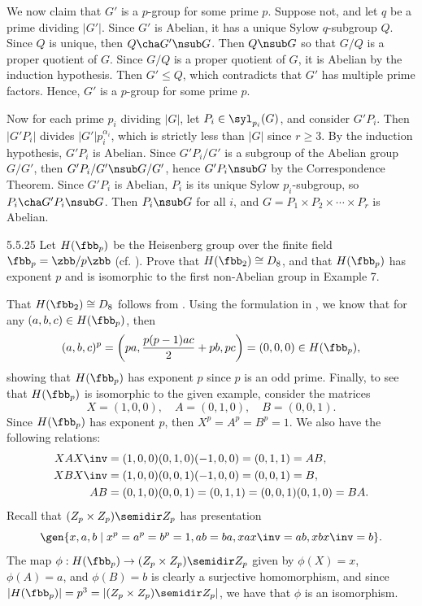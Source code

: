 \begin{soliff}
    We now claim that $G'$ is a $p$-group for some prime $p$.
    Suppose not, and let $q$ be a prime dividing $|G'|$.
    Since $G'$ is Abelian, it has a unique Sylow $q$-subgroup $Q$.
    Since $Q$ is unique, then $Q \cha G' \nsub G$.
    Then $Q \nsub G$ so that $G/Q$ is a proper quotient of $G$.
    Since $G/Q$ is a proper quotient of $G$, it is Abelian by the induction hypothesis.
    Then $G' \leq Q$, which contradicts that $G'$ has multiple prime factors.
    Hence, $G'$ is a $p$-group for some prime $p$.

    Now for each prime $p_i$ dividing $|G|$, let $P_i \in \syl_{p_i}(G)$, and consider $G'P_i$.
    Then $|G'P_i|$ divides $|G'|p_i^{\alpha_i}$, which is strictly less than $|G|$ since $r \geq 3$.
    By the induction hypothesis, $G'P_i$ is Abelian.
    Since $G'P_i/G'$ is a subgroup of the Abelian group $G/G'$, then $G'P_i/G' \nsub G/G'$, hence $G'P_i \nsub G$ by the Correspondence Theorem.
    Since $G'P_i$ is Abelian, $P_i$ is its unique Sylow $p_i$-subgroup, so $P_i \cha G'P_i \nsub G$.
    Then $P_i \nsub G$ for all $i$, and $G = P_1 \times P_2 \times \cdots \times P_r$ is Abelian.
\end{soliff}

\begin{exercise}{5.5.25}
    Let $H(\fbb_p)$ be the Heisenberg group over the finite field $\fbb_p = \zbb/p\zbb$ (cf. ).
	Prove that $H(\fbb_2) \cong D_8$, and that $H(\fbb_p)$ has exponent $p$ and is isomorphic to the first non-Abelian group in Example 7.
\end{exercise}

\begin{sol}
    That $H(\fbb_2) \cong D_8$ follows from .
    Using the formulation in , we know that for any $(a, b, c) \in H(\fbb_p)$, then
    \[
        (a, b, c)^p = \left(pa, \frac{p(p - 1)ac}{2} + pb, pc\right) = (0, 0, 0) \in H(\fbb_p),
    \]
    showing that $H(\fbb_p)$ has exponent $p$ since $p$ is an odd prime. Finally, to see that $H(\fbb_p)$ is isomorphic to the given example, consider the matrices
    \[
        X = (1, 0, 0), \quad A = (0, 1, 0), \quad B = (0, 0, 1).
    \]
    Since $H(\fbb_p)$ has exponent $p$, then $X^p = A^p = B^p = 1$.
    We also have the following relations:
    \begin{align*}
        X A X\inv &= (1, 0, 0)(0, 1, 0)(-1, 0, 0) = (0, 1, 1) = AB, \\
        X B X\inv &= (1, 0, 0)(0, 0, 1)(-1, 0, 0) = (0, 0, 1) = B, \\
        AB &= (0, 1, 0)(0, 0, 1) = (0, 1, 1) = (0, 0, 1)(0, 1, 0) = BA.
    \end{align*}
    Recall that $(Z_p \times Z_p) \semidir Z_p$ has presentation
    \[
        \gen{x, a, b \mid x^p = a^p = b^p = 1, ab = ba, xax\inv = ab, xbx\inv = b}.
    \]
    The map $\phi : H(\fbb_p) \to (Z_p \times Z_p) \semidir Z_p$ given by $\phi(X) = x$, $\phi(A) = a$, and $\phi(B) = b$ is clearly a surjective homomorphism, and since $|H(\fbb_p)| = p^3 = |(Z_p \times Z_p) \semidir Z_p|$, we have that $\phi$ is an isomorphism.
\end{sol}
